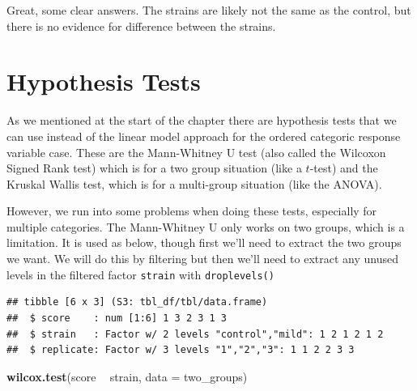 \documentclass[
]{book}
\newenvironment{Shaded}{\begin{snugshade}}{\end{snugshade}}
\newcommand{\DataTypeTok}[1]{\textcolor[rgb]{0.13,0.29,0.53}{#1}}
\newcommand{\KeywordTok}[1]{\textcolor[rgb]{0.13,0.29,0.53}{\textbf{#1}}}
\newcommand{\NormalTok}[1]{#1}
\newcommand{\OperatorTok}[1]{\textcolor[rgb]{0.81,0.36,0.00}{\textbf{#1}}}
\newcommand{\StringTok}[1]{\textcolor[rgb]{0.31,0.60,0.02}{#1}}
\begin{document}
Great, some clear answers. The strains are likely not the same as the control, but there is no evidence for difference between the strains.

\hypertarget{hypothesis-tests}{%
\section{Hypothesis Tests}\label{hypothesis-tests}}

As we mentioned at the start of the chapter there are hypothesis tests that we can use instead of the linear model approach for the ordered categoric response variable case. These are the Mann-Whitney U test (also called the Wilcoxon Signed Rank test) which is for a two group situation (like a \(t\)-test) and the Kruskal Wallis test, which is for a multi-group situation (like the ANOVA).

However, we run into some problems when doing these tests, especially for multiple categories. The Mann-Whitney U only works on two groups, which is a limitation. It is used as below, though first we'll need to extract the two groups we want. We will do this by filtering but then we'll need to extract any unused levels in the filtered factor \texttt{strain} with \texttt{droplevels()}

\begin{Shaded}
\end{Shaded}

\begin{verbatim}
## tibble [6 x 3] (S3: tbl_df/tbl/data.frame)
##  $ score    : num [1:6] 1 3 2 3 1 3
##  $ strain   : Factor w/ 2 levels "control","mild": 1 2 1 2 1 2
##  $ replicate: Factor w/ 3 levels "1","2","3": 1 1 2 2 3 3
\end{verbatim}

\begin{Shaded}
\begin{Highlighting}[]
\KeywordTok{wilcox.test}\NormalTok{(score }\OperatorTok{~}\StringTok{ }\NormalTok{strain, }\DataTypeTok{data =}\NormalTok{ two_groups)}
\end{Highlighting}
\end{Shaded}
\end{document}

